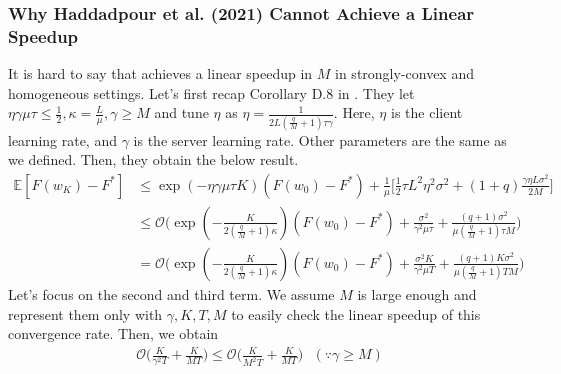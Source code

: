 \subsubsection{Why Haddadpour et al. (2021) Cannot Achieve a Linear Speedup}
It is hard to say that \citet{haddadpour2021federated} achieves a linear speedup in $M$ in strongly-convex and homogeneous settings. Let's first recap Corollary D.8 in \citet{haddadpour2021federated}. They let $\eta\gamma\mu\tau \leq \frac{1}{2}, \kappa = \frac{L}{\mu}, \gamma \geq M$ and tune $\eta$ as $\eta = \frac{1}{2L(\frac{q}{M}+1)\tau\gamma}$. Here, $\eta$ is the client learning rate, and $\gamma$ is the server learning rate. Other parameters are the same as we defined. Then, they obtain the below result. 
\begin{align} \label{app:C1-rate1}
    \mathbb{E}[F(w_K)- F^*] &\leq \exp(-\eta\gamma\mu\tau K)(F(w_0) - F^*) + \frac{1}{\mu}\Big[\frac{1}{2}\tau L^2\eta^2\sigma^2 + (1+q)\frac{\gamma\eta L\sigma^2}{2M}\Big] \\
    &\leq \mathcal{O} \Big(\exp(-\frac{K}{2(\frac{q}{M}+1)\kappa})(F(w_0) - F^*) + \frac{\sigma^2}{\gamma^2\mu\tau} + \frac{(q+1)\sigma^2}{\mu(\frac{q}{M}+1)\tau M} \Big) \nonumber \\
    &= \mathcal{O} \Big(\exp(-\frac{K}{2(\frac{q}{M}+1)\kappa})(F(w_0) - F^*) + \frac{\sigma^2 K}{\gamma^2\mu T} + \frac{(q+1)K \sigma^2}{\mu(\frac{q}{M}+1)T M} \Big) \nonumber
\end{align}
Let's focus on the second and third term. We assume $M$ is large enough and represent them only with $\gamma, K, T, M$ to easily check the linear speedup of this convergence rate. Then, we obtain
\begin{align} \label{app:C1-rate2}
    \mathcal{O}\Big( \frac{K}{\gamma^2 T} + \frac{K}{MT}\Big) \leq \mathcal{O}\Big( \frac{K}{M^2 T} + \frac{K}{MT}\Big) \textrm{ }(\because \gamma \geq M)
\end{align}
